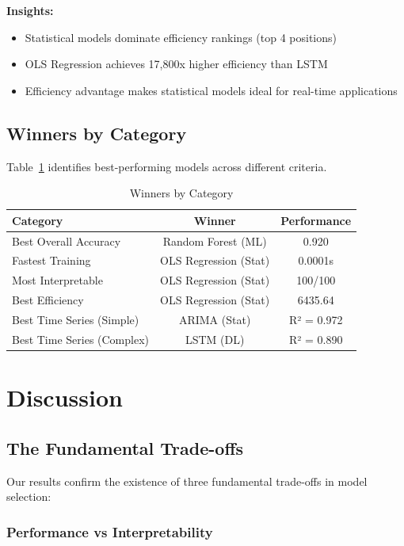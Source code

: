 \documentclass[11pt,a4paper]{article}
\begin{document}
\textbf{Insights:}
\begin{itemize}
    \item Statistical models dominate efficiency rankings (top 4 positions)
    \item OLS Regression achieves 17,800x higher efficiency than LSTM
    \item Efficiency advantage makes statistical models ideal for real-time applications
\end{itemize}

\subsection{Winners by Category}

Table~\ref{tab:winners} identifies best-performing models across different criteria.

\begin{table}[h]
\centering
\begin{tabular}{lcc}
\toprule
\textbf{Category} & \textbf{Winner} & \textbf{Performance} \\
\midrule
Best Overall Accuracy & Random Forest (ML) & 0.920 \\
Fastest Training & OLS Regression (Stat) & 0.0001s \\
Most Interpretable & OLS Regression (Stat) & 100/100 \\
Best Efficiency & OLS Regression (Stat) & 6435.64 \\
Best Time Series (Simple) & ARIMA (Stat) & R² = 0.972 \\
Best Time Series (Complex) & LSTM (DL) & R² = 0.890 \\
\bottomrule
\end{tabular}
\caption{Winners by Category}
\label{tab:winners}
\end{table}

\section{Discussion}

\subsection{The Fundamental Trade-offs}

Our results confirm the existence of three fundamental trade-offs in model selection:

\subsubsection{Performance vs Interpretability}
\end{document}
